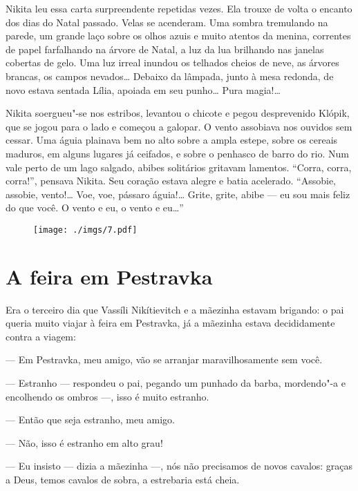 Nikita leu essa carta surpreendente repetidas vezes. Ela trouxe de volta
o encanto dos dias do Natal passado. Velas se acenderam. Uma sombra
tremulando na parede, um grande laço sobre os olhos azuis e
muito atentos da menina, correntes de papel farfalhando na árvore
de Natal, a luz da lua brilhando nas janelas cobertas de gelo. Uma luz
irreal inundou os telhados cheios de neve, as árvores brancas, os campos
nevados\ldots{} Debaixo da lâmpada, junto à mesa redonda, de novo estava
sentada Lília, apoiada em seu punho\ldots{} Pura magia!\ldots{}

Nikita soergueu"-se nos estribos, levantou o chicote e pegou desprevenido
Klópik, que se jogou para o lado e começou a galopar. O vento assobiava
nos ouvidos sem cessar. Uma águia plainava bem no alto sobre a ampla
estepe, sobre os cereais maduros, em alguns lugares já ceifados, e sobre
o penhasco de barro do rio. Num vale perto de um lago salgado, abibes
solitários gritavam lamentos. ``Corra, corra, corra!'', pensava Nikita.
Seu coração estava alegre e batia acelerado. ``Assobie, assobie,
vento!\ldots{} Voe, voe, pássaro águia!\ldots{} Grite, grite, abibe --- eu sou
mais feliz do que você. O vento e eu, o vento e eu\ldots{}''

\begin{figure}
\vspace*{-2.65cm}
\hspace*{-2.85cm}\texttt{[image: ./imgs/7.pdf]}
\end{figure}

\chapter{A feira em Pestravka}

Era o terceiro dia que Vassíli Nikítievitch e a mãezinha estavam
brigando: o pai queria muito viajar à feira em Pestravka, já a mãezinha
estava decididamente contra a viagem:

--- Em Pestravka, meu amigo, vão se arranjar maravilhosamente sem você.

--- Estranho --- respondeu o pai, pegando um punhado da barba,
mordendo"-a e encolhendo os ombros ---, isso é muito estranho.

--- Então que seja estranho, meu amigo.

--- Não, isso é estranho em alto grau!

--- Eu insisto --- dizia a mãezinha ---, nós não precisamos de novos
cavalos: graças a Deus, temos cavalos de sobra, a estrebaria está cheia.

